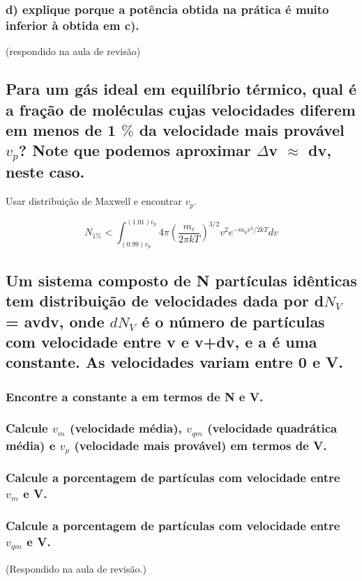 \documentclass{article}
\begin{document}
\subsubsection{d) explique porque a potência obtida na prática é muito inferior à obtida em c).}

(respondido na aula de revisão)


\subsection{Para um gás ideal em equilíbrio térmico, qual é a fração de moléculas cujas velocidades diferem em menos de 1 $\%$ da velocidade mais provável $v_p$? Note que podemos aproximar $\Delta$v $\approx$ dv, neste caso.}
Usar distribuição de Maxwell e encontrar $v_p$.

\begin{equation}
    N_{1\%} < \int^{(1.01)v_p}_{(0.99)v_p}
    4\pi \left(\frac{m_e}{2 \pi kT}\right)^{3/2}
    v^2e^{-m_0 v^2/2kT} dv
\end{equation}

\subsection{Um sistema composto de N partículas idênticas tem distribuição de velocidades dada por  d$N_V$  = avdv, onde $dN_V$ é o número de partículas com velocidade entre v e v+dv, e a é uma constante. As velocidades variam entre 0 e V.
}
\subsubsection{Encontre a constante a em termos de N e V. 
}
\subsubsection{Calcule $v_m$ (velocidade média), $v_{qm}$ (velocidade quadrática média) e $v_p$ (velocidade mais provável) em termos de V.
}
\subsubsection{Calcule a porcentagem de partículas com velocidade entre $v_m$ e V.
}
\subsubsection{Calcule a porcentagem de partículas com velocidade entre $v_{qm}$ e V.
}

(Respondido na aula de revisão.)
\end{document}
